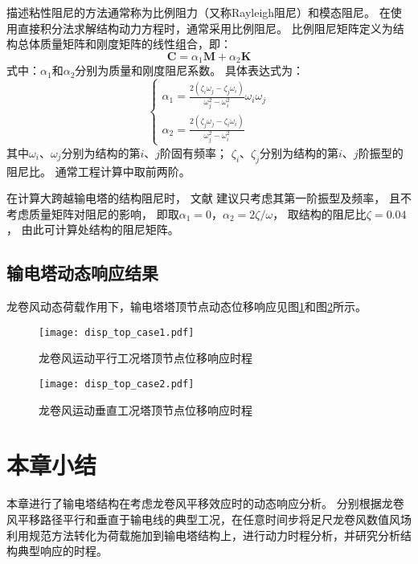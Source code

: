 描述粘性阻尼的方法通常称为比例阻力（又称Rayleigh阻尼）和模态阻尼。
在使用直接积分法求解结构动力方程时，通常采用比例阻尼。
比例阻尼矩阵定义为结构总体质量矩阵和刚度矩阵的线性组合，即：
\begin{equation}
  \bm{C} = \alpha_1 \bm{M} + \alpha_2 \bm{K}
\end{equation}
式中：$\alpha_1$和$\alpha_2$分别为质量和刚度阻尼系数。
具体表达式为：
\begin{equation}
    \begin{cases}
        \alpha_1 = \frac{2\left(\zeta_i\omega_j-\zeta_j \omega_i\right)}{\omega_j^2-\omega_i^2} \omega_i \omega_j \\
        \alpha_2 = \frac{2\left(\zeta_j \omega_j-\zeta_i \omega_i\right)}{\omega_j^2-\omega_i^2} 
    \end{cases}
\end{equation}
其中$\omega_i$、$\omega_j$分别为结构的第$i$、$j$阶固有频率；
$\zeta_i$、$\zeta_j$分别为结构的第$i$、$j$阶振型的阻尼比。
通常工程计算中取前两阶。

在计算大跨越输电塔的结构阻尼时，
文献\cite{wong2009guidelines}\cite{loredo2003influence}\cite{madugula2001dynamic}\cite{ostendorp1997damping}
建议只考虑其第一阶振型及频率，
且不考虑质量矩阵对阻尼的影响，
即取$\alpha_1=0$，$\alpha_2=2\zeta/\omega$，
取结构的阻尼比$\zeta=0.04$\cite{loredo2003influence}，
由此可计算处结构的阻尼矩阵。

\subsection{输电塔动态响应结果}

龙卷风动态荷载作用下，输电塔塔顶节点动态位移响应见图\ref{fig:disp_top_case1}和图\ref{fig:disp_top_case2}所示。
\begin{figure}[!htpb]
    \centering
    \texttt{[image: disp\_top\_case1.pdf]}
    \caption{龙卷风运动平行工况塔顶节点位移响应时程}
    \label{fig:disp_top_case1}
\end{figure}
\begin{figure}[!htpb]
    \centering
    \texttt{[image: disp\_top\_case2.pdf]}
    \caption{龙卷风运动垂直工况塔顶节点位移响应时程}
    \label{fig:disp_top_case2}
\end{figure}

\section{本章小结}
本章进行了输电塔结构在考虑龙卷风平移效应时的动态响应分析。
分别根据龙卷风平移路径平行和垂直于输电线的典型工况，在任意时间步将足尺龙卷风数值风场利用规范方法转化为荷载施加到输电塔结构上，进行动力时程分析，并研究分析结构典型响应的时程。

